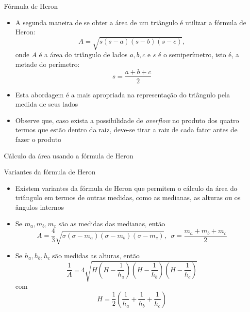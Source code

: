 \begin{frame}[fragile]{Fórmula de Heron}

    \begin{itemize}
        \item A segunda maneira de se obter a área de um triângulo é utilizar a fórmula de Heron:
        \[
            A = \sqrt{s(s - a)(s - b)(s - c)},
        \]
        onde $A$ é a área do triângulo de lados $a, b, c$ e $s$ é o semiperímetro, isto é, a
        metade do perímetro:
        \[
            s = \frac{a + b + c}{2}
        \]

        \item Esta abordagem é a mais apropriada na representação do triângulo pela medida de seus 
            lados

        \item Observe que, caso exista a possibilidade de \textit{overflow} no produto dos quatro 
            termos que estão dentro da raiz, deve-se tirar a raiz de cada fator antes de fazer o produto

    \end{itemize}

\end{frame}

\begin{frame}[fragile]{Cálculo da área usando a fórmula de Heron}
\end{frame}

\begin{frame}[fragile]{Variantes da fórmula de Heron}

    \begin{itemize}
        \item Existem variantes da fórmula de Heron que permitem o cálculo da área do triângulo em termos de outras medidas, como as medianas, as alturas ou os ângulos internos

        \item Se $m_a, m_b, m_c$ são as medidas das medianas, então
        \[
            A = \frac{4}{3}\sqrt{\sigma(\sigma - m_a)(\sigma - m_b)(\sigma - m_c)}, \, \, \, \sigma = \frac{m_a + m_b + m_c}{2}
        \]

        \item Se $h_a, h_b, h_c$ são medidas as alturas, então
        \[
            \frac{1}{A} = 4\sqrt{H\left(H - \frac{1}{h_a}\right)\left(H - \frac{1}{h_b}\right)\left(H - \frac{1}{h_c}\right)}
        \]
        com
        \[H = \frac{1}{2}\left(\frac{1}{h_a} + \frac{1}{h_b} + \frac{1}{h_c}\right)
        \]

    \end{itemize}

\end{frame}

